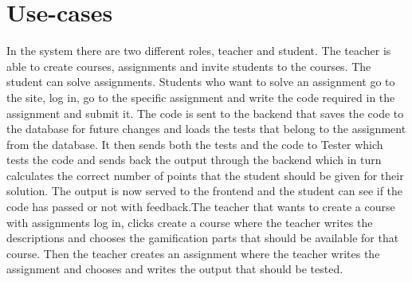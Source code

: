 \section{Use-cases}
In the system there are two different roles, teacher and student. The teacher is able to create courses, assignments and invite students to the courses. The student can solve assignments.
Students who want to solve an assignment go to the site, log in, go to the specific assignment and write the code required in the assignment and submit it. The code is sent to the backend that saves the code to the database for future changes and loads the tests that belong to the assignment from the database. It then sends both the tests and the code to Tester which tests the code and sends back the output through the backend which in turn calculates the correct number of points that the student should be given for their solution. The output is now served to the frontend and the student can see if the code has passed or not with feedback.The teacher that wants to create a course with assignments log in, clicks create a course where the teacher writes the descriptions and chooses the gamification parts that should be available for that course. Then the teacher creates an assignment where the teacher writes the assignment and chooses and writes the output that should be tested.


